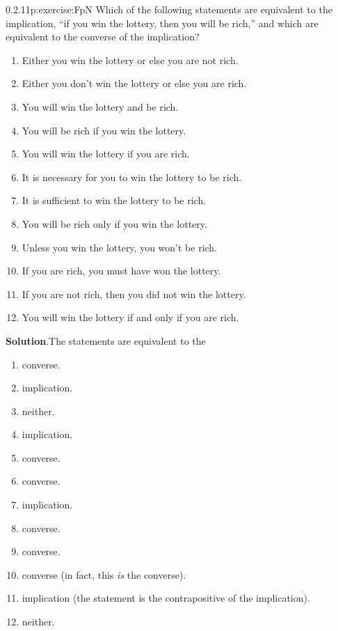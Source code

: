 \documentclass[twoside,11pt,]{book}
\newcommand{\blocktitlefont}{\relax}
\numberwithin{equation}{chapter}
\begin{document}
\begin{divisionsolution}{0.2.11}{}{p:exercise:FpN}%
Which of the following statements are equivalent to the implication, ``if you win the lottery, then you will be rich,'' and which are equivalent to the converse of the implication?%
\begin{enumerate}[label=(\alph*)]
\item{}Either you win the lottery or else you are not rich.%
\item{}Either you don't win the lottery or else you are rich.%
\item{}You will win the lottery and be rich.%
\item{}You will be rich if you win the lottery.%
\item{}You will win the lottery if you are rich.%
\item{}It is necessary for you to win the lottery to be rich.%
\item{}It is sufficient to win the lottery to be rich.%
\item{}You will be rich only if you win the lottery.%
\item{}Unless you win the lottery, you won't be rich.%
\item{}If you are rich, you must have won the lottery.%
\item{}If you are not rich, then you did not win the lottery.%
\item{}You will win the lottery if and only if you are rich.%
\end{enumerate}
%
\par\smallskip%
\noindent\textbf{\blocktitlefont Solution}.\quad{}The statements are equivalent to the\textellipsis{}%
\begin{enumerate}[label=(\alph*)]
\item{}converse.%
\item{}implication.%
\item{}neither.%
\item{}implication.%
\item{}converse.%
\item{}converse.%
\item{}implication.%
\item{}converse.%
\item{}converse.%
\item{}converse (in fact, this \emph{is} the converse).%
\item{}implication (the statement is the contrapositive of the implication).%
\item{}neither.%
\end{enumerate}
%
\end{divisionsolution}%
\end{document}
